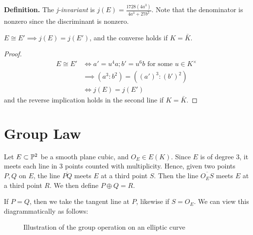 \documentclass[10pt,a4paper]{article}
\begin{document}
\textbf{Definition.} The \emph{j-invariant} is $j(E) = \frac{1728(4a^3)}{4a^3+27b^2}$. Note that the denominator is nonzero since the discriminant is nonzero.

\begin{corollary}
  $E \cong E' \implies j(E) = j(E')$, and the converse holds if $K = \bar{K}$.
\end{corollary}
\begin{proof}
  \begin{align*}
    E \cong E' &\iff a' = u^4a; b' = u^6 b\text{ for some } u \in K^\times \\
    &\implies (a^3:b^2) = ((a')^3:(b')^2)\\
    &\iff j(E) = j(E')
  \end{align*}
  and the reverse implication holds in the second line if $K = \bar{K}$.
\end{proof}

\section{Group Law}
Let $E \subset \P^2$ be a smooth plane cubic, and $O_E \in E(K)$. Since $E$ is of degree 3, it meets each line in 3 points counted with multiplicity. Hence, given two points $P, Q$ on $E$, the line $\overline{PQ}$ meets $E$ at a third point $S$. Then the line $\overline{O_E S}$ meets $E$ at a third point $R$. We then define $P \oplus Q = R$.

If $P=Q$, then we take the tangent line at $P$, likewise if $S = O_E$. We can view this diagrammatically as follows:
\begin{figure}[H]
  \centering
  \caption{Illustration of the group operation on an elliptic curve}
\end{figure}
\end{document}
